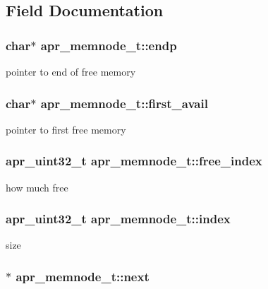 \subsection{Field Documentation}
\hypertarget{structapr__memnode__t_a35c9bf71f1cc680929f857176b547a05}{
\subsubsection[{endp}]{\setlength{\rightskip}{0pt plus 5cm}char$\ast$ apr\-\_\-memnode\-\_\-t\-::endp}}\label{structapr__memnode__t_a35c9bf71f1cc680929f857176b547a05}
pointer to end of free memory \hypertarget{structapr__memnode__t_a863e7980225e46678881271c4c803e4c}{
\subsubsection[{first\-\_\-avail}]{\setlength{\rightskip}{0pt plus 5cm}char$\ast$ apr\-\_\-memnode\-\_\-t\-::first\-\_\-avail}}\label{structapr__memnode__t_a863e7980225e46678881271c4c803e4c}
pointer to first free memory \hypertarget{structapr__memnode__t_af63769f30f6eb9d72e4b24050bd7a9d9}{
\subsubsection[{free\-\_\-index}]{\setlength{\rightskip}{0pt plus 5cm}apr\-\_\-uint32\-\_\-t apr\-\_\-memnode\-\_\-t\-::free\-\_\-index}}\label{structapr__memnode__t_af63769f30f6eb9d72e4b24050bd7a9d9}
how much free \hypertarget{structapr__memnode__t_a6188325f9e1cbcafcb0a65b7e41881a1}{
\subsubsection[{index}]{\setlength{\rightskip}{0pt plus 5cm}apr\-\_\-uint32\-\_\-t apr\-\_\-memnode\-\_\-t\-::index}}\label{structapr__memnode__t_a6188325f9e1cbcafcb0a65b7e41881a1}
size \hypertarget{structapr__memnode__t_a07dd84ca152164d6bc283dbce99f8f78}{
\subsubsection[{next}]{$\ast$ apr\-\_\-memnode\-\_\-t\-::next}}\label{structapr__memnode__t_a07dd84ca152164d6bc283dbce99f8f78}
